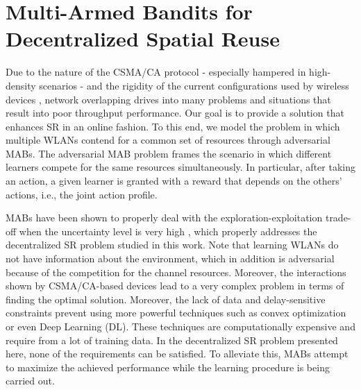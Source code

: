 \documentclass{article}
\begin{document}
\section{Multi-Armed Bandits for Decentralized Spatial Reuse}
\label{section:mabs}
Due to the nature of the CSMA/CA protocol - especially hampered in high-density scenarios - and the rigidity of the current configurations used by wireless devices \cite{akella2007self}, network overlapping drives into many problems and situations that result into poor throughput performance. Our goal is to provide a solution that enhances SR in an online fashion. To this end, we model the problem in which multiple WLANs contend for a common set of resources through adversarial MABs. The adversarial MAB problem \cite{auer1995gambling} frames the scenario in which different learners compete for the same resources simultaneously. In particular, after taking an action, a given learner is granted with a reward that depends on the others' actions, i.e., the joint action profile. 

MABs have been shown to properly deal with the exploration-exploitation trade-off when the uncertainty level is very high \cite{auer2002finite, audibert2009exploration, scott2010modern}, which properly addresses the decentralized SR problem studied in this work. Note that learning WLANs do not have information about the environment, which in addition is adversarial because of the competition for the channel resources. Moreover, the interactions shown by CSMA/CA-based devices lead to a very complex problem in terms of finding the optimal solution. Moreover, the lack of data and delay-sensitive constraints prevent using more powerful techniques such as convex optimization or even Deep Learning (DL). These techniques are computationally expensive and require from a lot of training data. In the decentralized SR problem presented here, none of the requirements can be satisfied. To alleviate this, MABs attempt to maximize the achieved performance while the learning procedure is being carried out.
\end{document}
